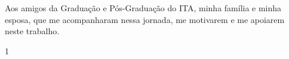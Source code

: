 \maketitle

\begin{itadedication}
Aos amigos da Graduação e Pós-Graduação do ITA, minha família e minha esposa, que me acompanharam nessa jornada, me motivarem e me apoiarem neste trabalho.
\end{itadedication}

\begin{itathanks}

\end{itathanks}

\ifhyperref{}\fi
\begin{flushright}
\begin{spacing}{1}
\mbox{}\vfill

\end{spacing}
\end{flushright}

\begin{abstract}
\noindent

\end{abstract}

\begin{englishabstract}
\noindent

\end{englishabstract}

\listoffigures %

\listoftables %

%
\listofabbreviations
    
\addsymbolstolist   %
\listofsymbols

\tableofcontents
